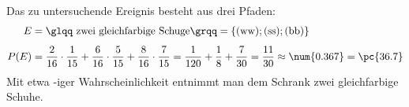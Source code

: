 \begin{exercise}
\begin{center}
    \end{center}
    Das zu untersuchende Ereignis besteht aus drei Pfaden:
    \begin{equation*}
      \begin{split}
        E&=\text{\glqq zwei gleichfarbige Schuge\grqq}
        =\{(\text{ww});(\text{ss});(\text{bb})\}
        \\[1ex]
        P(E)&=\frac{2}{16}\cdot\frac{1}{15}
             +\frac{6}{16}\cdot\frac{5}{15}
             +\frac{8}{16}\cdot\frac{7}{15}
        =\frac{1}{120}+\frac{1}{8}+\frac{7}{30}
        =\frac{11}{30}
        \approx\num{0.367}
        =\pc{36.7}
      \end{split}
    \end{equation*}
    Mit etwa -iger Wahrscheinlichkeit
    entnimmt man dem Schrank zwei gleichfarbige
    Schuhe.
  \fi
\end{exercise}
